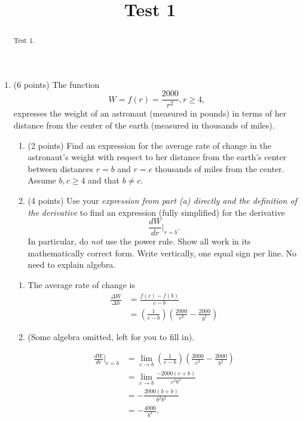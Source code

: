 \documentclass{ximera}
\title{Test 1}
\begin{document}
\begin{abstract}
Test 1.
\end{abstract}
\maketitle

\begin{enumerate}

\item (6 points) The function
\[
        W = f(r) = \frac{2000}{r^2} , r\geq 4 ,
\]
expresses the weight of an astronaut (measured in pounds) in terms of her distance from the center of the earth (measured in thousands of miles).

\begin{enumerate}
\item (2 points) Find an expression for the average rate of change in the astronaut's weight with respect to her distance from the earth's center between distances $r=b$ and $r=c$ thousands of miles from the center. Assume $b,c\geq 4$ and that $b\neq c$.

\item (4 points) Use your \emph{expression from part (a) directly and the definition of the derivative} to find an expression (fully simplified) for the derivative
\[
   \frac{dW}{dr}\Big|_{r=b} .
\]
In particular, do \emph{not} use the power rule. Show all work in its mathematically correct form. Write vertically, one equal sign per line. No need to explain algebra.
\end{enumerate}  


\begin{explanation}
\begin{enumerate}
\item The average rate of change is
\begin{align*}
  \frac{\Delta W}{\Delta h} &= \frac{f(c)-f(b)}{c-b}  \\
                      &= \left(\frac{1}{c-b}\right) \left(  \frac{2000}{c^2} - \frac{2000}{b^2} \right)
\end{align*}

\item (Some algebra omitted, left for you to fill in).

\begin{align*}
 \frac{dW}{dr}\Big|_{r=b} &= \lim_{c\to b} \left(\frac{1}{c-b}\right) \left(  \frac{2000}{c^2} - \frac{2000}{b^2} \right) \\
                         &= \lim_{c\to b} \frac{-2000(c+b)}{c^2b^2} \\
                        & =  -\frac{2000(b+b)}{b^2b^2} \\
                      &= -\frac{4000}{b^3} .
\end{align*}


\end{enumerate}
\end{explanation}
\end{enumerate}
\end{document}
